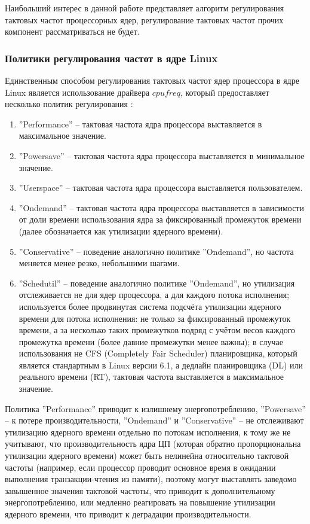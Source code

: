     Наибольший интерес в данной работе представляет алгоритм регулирования тактовых частот процессорных
    ядер, регулирование тактовых частот прочих компонент рассматриваться не будет.

\subsubsection{Политики регулирования частот в ядре Linux}

    Единственным способом регулирования тактовых частот ядер процессора в ядре Linux является
    использование драйвера $cpufreq$, который предоставляет несколько политик
    регулирования \cite{KernelCPUfreq}:
    \begin{enumerate}
        \item ''Performance'' -- тактовая частота ядра процессора выставляется в максимальное значение.
        \item ''Powersave'' -- тактовая частота ядра процессора выставляется в минимальное значение.
        \item ''Userspace'' -- тактовая частота ядра процессора выставляется пользователем.
        \item ''Ondemand'' -- тактовая частота ядра процессора выставляется в зависимости от доли времени
        использования ядра за фиксированный промежуток времени (далее обозначается как утилизации
        ядерного времени).
        \item ''Conservative'' -- поведение аналогично политике ''Ondemand'', но частота меняется менее
        резко, небольшими шагами.
        \item ''Schedutil'' \cite{KernelDocsSchedutil} -- поведение аналогично политике ''Ondemand'',
        но утилизация отслеживается не для ядер процессора, а для каждого потока исполнения;
        используется более продвинутая система подсчёта утилизации ядерного времени для потока исполнения:
        не только за фиксированный промежуток времени, а за несколько таких промежутков подряд с учётом
        весов каждого промежутка времени (более давние промежутки менее важны); в случае использования
        не CFS (Completely Fair Scheduler) планировщика, который является стандартным в Linux версии 6.1,
        а дедлайн планировщика (DL) или реального времени (RT), тактовая частота выставляется в
        максимальное значение.
    \end{enumerate}

    Политика ''Performance'' приводит к излишнему энергопотреблению, ''Powersave'' -- к потере
    производительности, ''Ondemand'' и ''Conservative'' -- не отслеживают утилизацию ядерного времени
    отдельно по потокам исполнения, к тому же не учитывают, что производительность ядра ЦП (которая
    обратно пропорциональна утилизации ядерного времени) может быть нелинейна относительно тактовой
    частоты (например, если процессор проводит основное время в ожидании выполнения транзакции-чтения
    из памяти), поэтому могут выставлять заведомо завышенное значения тактовой частоты, что приводит
    к дополнительному энергопотреблению, или медленно реагировать на повышение утилизации ядерного времени,
    что приводит к деградации производительности.

